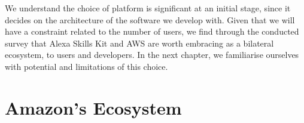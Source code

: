 	
	


%
%
%
%
%










%
%
%
%


















We understand the choice of platform is significant at an initial stage, since it decides on the architecture of the software we develop with. Given that we will have a constraint related to the number of users, we find through the conducted survey that Alexa Skills Kit and AWS are worth embracing as a bilateral ecosystem, to users and developers. In the next chapter, we familiarise ourselves with potential and limitations of this choice.


\chapter{Amazon's Ecosystem}
\label{amznecosys}

